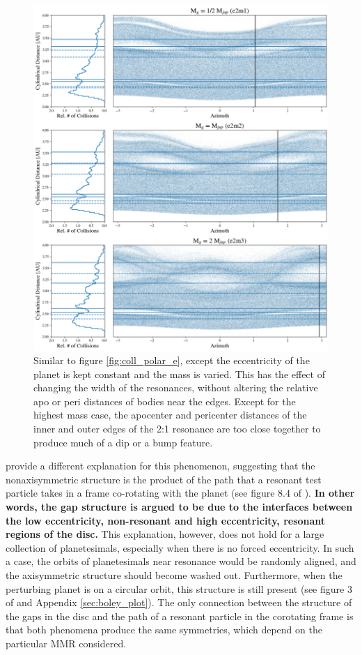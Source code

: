 \documentclass[fleqn,usenatbib]{mnras}
\begin{document}
\begin{figure}
    \includegraphics[width=\textwidth]{figures/coll_polar_m.png}
    \caption{Similar to figure \ref{fig:coll_polar_e}, except the eccentricity of the planet is kept constant and the mass is varied.
    This has the effect of changing the width of the resonances, without altering the relative apo or peri distances of
    bodies near the edges. Except for the highest mass case, the apocenter and pericenter distances of the inner and outer edges of the 2:1 
    resonance are too close together to produce much of a dip or a bump feature.\label{fig:coll_polar_m}}
\end{figure}

\citet{2016ApJ...818..159T} provide a different explanation for this phenomenon, suggesting that the nonaxisymmetric structure is the product 
of the path that a resonant test particle takes in a frame co-rotating with the planet (see figure 8.4 of \citet{1999ssd..book.....M}). \textbf{In other words, the gap structure is argued to be 
due to the interfaces between the low eccentricity, non-resonant and high eccentricity, resonant regions of the disc.} This explanation, 
however, does not hold for a large collection of planetesimals, especially when there is no forced eccentricity. In such a case, the orbits of 
planetesimals near resonance would be randomly aligned, and the axisymmetric structure should become washed out. Furthermore, when the perturbing 
planet is on a circular orbit, this structure is still present (see figure 3 of \citet{2016ApJ...818..159T} and Appendix \ref{sec:boley_plot}). The only 
connection between the structure of the gaps in the disc and the path of a resonant particle in the corotating frame is that both phenomena produce the 
same symmetries, which depend on the particular MMR considered.
\end{document}
